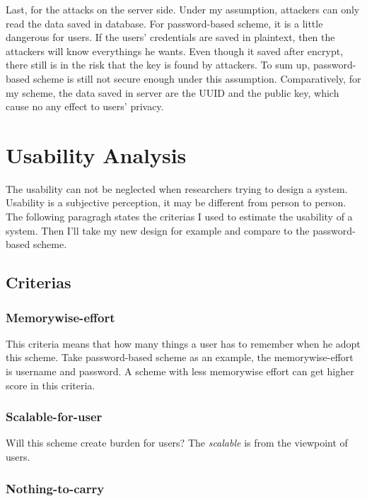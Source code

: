 \begin{CJK}{Bg5}{bsmi}
Last, for the attacks on the server side. Under my assumption, attackers can only read the data saved in database. For password-based scheme, it is a little dangerous for users. If the users' credentials are saved in plaintext, then the attackers will know everythings he wants. Even though it saved after encrypt, there still is in the risk that the key is found by attackers. To sum up, password-based scheme is still not secure enough under this assumption. Comparatively, for my scheme, the data saved in server are the UUID and the public key, which cause no any effect to users' privacy.

\section{Usability Analysis}

The usability can not be neglected when researchers trying to design a system.
Usability is a subjective perception, it may be different from person to person.
The following paragragh states the criterias I used to estimate the usability of a system. Then I'll take my new design for example and compare to the password-based scheme.

\subsection{Criterias}

\subsubsection{Memorywise-effort}

This criteria means that how many things a user has to remember when he adopt this scheme. Take password-based scheme as an example, the memorywise-effort is username and password. A scheme with less memorywise effort can get higher score in this criteria.

\subsubsection{Scalable-for-user}

Will this scheme create burden for users? The \emph{scalable} is from the viewpoint of users.

\subsubsection{Nothing-to-carry}


\end{CJK}
